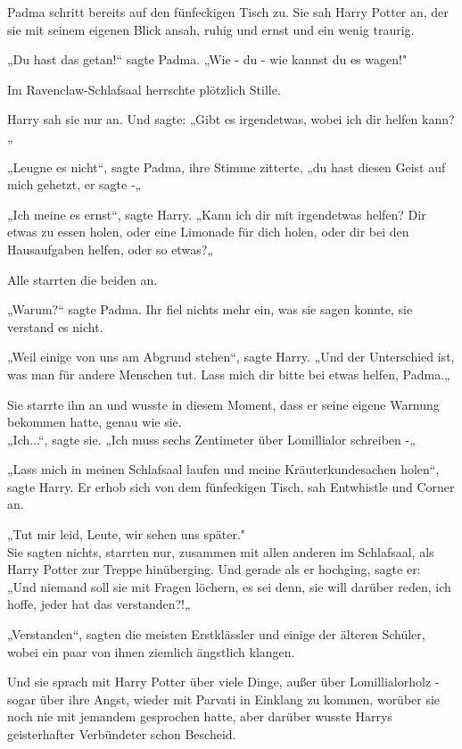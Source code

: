 {Padma schritt bereits auf den fünfeckigen Tisch zu. Sie sah Harry Potter an, der sie mit seinem eigenen Blick ansah, ruhig und ernst und ein wenig traurig.

„Du hast das getan!“ sagte Padma. „Wie - du - wie kannst du es wagen!"

Im Ravenclaw-Schlafsaal herrschte plötzlich Stille.

Harry sah sie nur an. Und sagte: „Gibt es irgendetwas, wobei ich dir helfen kann?„

„Leugne es nicht“, sagte Padma, ihre Stimme zitterte, „du hast diesen Geist auf mich gehetzt, er sagte -„

„Ich meine es ernst“, sagte Harry. „Kann ich dir mit irgendetwas helfen? Dir etwas zu essen holen, oder eine Limonade für dich holen, oder dir bei den Hausaufgaben helfen, oder so etwas?„

Alle starrten die beiden an.

„Warum?“ sagte Padma. Ihr fiel nichts mehr ein, was sie sagen konnte, sie verstand es nicht.

„Weil einige von uns am Abgrund stehen“, sagte Harry. „Und der Unterschied ist, was man für andere Menschen tut. Lass mich dir bitte bei etwas helfen, Padma.„

Sie starrte ihn an und wusste in diesem Moment, dass er seine eigene Warnung bekommen hatte, genau wie sie.\\ „Ich...“, sagte sie. „Ich muss sechs Zentimeter über Lomillialor schreiben -„

„Lass mich in meinen Schlafsaal laufen und meine Kräuterkundesachen holen“, sagte Harry. Er erhob sich von dem fünfeckigen Tisch, sah Entwhistle und Corner an.

„Tut mir leid, Leute, wir sehen uns später."\\ Sie sagten nichts, starrten nur, zusammen mit allen anderen im Schlafsaal, als Harry Potter zur Treppe hinüberging. Und gerade als er hochging, sagte er:\\ „Und niemand soll sie mit Fragen löchern, es sei denn, sie will darüber reden, ich hoffe, jeder hat das verstanden?!„

„Verstanden“, sagten die meisten Erstklässler und einige der älteren Schüler, wobei ein paar von ihnen ziemlich ängstlich klangen.

Und sie sprach mit Harry Potter über viele Dinge, außer über Lomillialorholz - sogar über ihre Angst, wieder mit Parvati in Einklang zu kommen, worüber sie noch nie mit jemandem gesprochen hatte, aber darüber wusste Harrys geisterhafter Verbündeter schon Bescheid.

}
